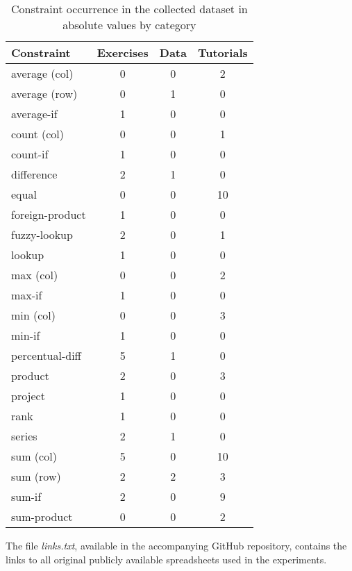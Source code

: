 {\begin{table}[htb]
  \centering
  \caption{Constraint occurrence in the collected dataset in absolute values by category}
  \label{tab:constraint_by_category}
  \begin{tabular}{l | c c c }
    \textbf{Constraint} & \textbf{Exercises} & \textbf{Data} & \textbf{Tutorials}  \\\hline
    average (col) & 0 & 0 & 2 \\
    average (row) & 0 & 1 & 0 \\
    average-if    & 1 & 0 & 0 \\
    count (col) & 0 & 0 & 1 \\
    count-if & 1 & 0 & 0 \\
    difference & 2 & 1 & 0 \\
    equal & 0 & 0 & 10 \\
    foreign-product & 1 & 0 & 0 \\
    fuzzy-lookup & 2 & 0 & 1 \\
    lookup & 1 & 0 & 0 \\
    max (col) & 0 & 0 & 2 \\
    max-if & 1 & 0 & 0 \\
    min (col) & 0 & 0 & 3 \\
    min-if & 1 & 0 & 0 \\
    percentual-diff & 5 & 1 & 0 \\
    product & 2 & 0 & 3 \\
    project & 1 & 0 & 0 \\
    rank & 1 & 0 & 0 \\
    series & 2 & 1 & 0 \\
    sum (col) & 5 & 0 & 10 \\
    sum (row) & 2 & 2 & 3 \\
    sum-if & 2 & 0 & 9 \\
    sum-product & 0 & 0 & 2 \\
  \end{tabular}
\end{table}

The file \textit{links.txt}, available in the accompanying GitHub repository, contains the links to all original publicly available spreadsheets used in the experiments.
}


\cleardoublepage

